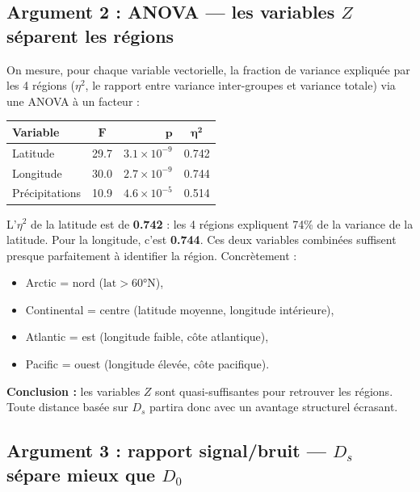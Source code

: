 \documentclass[11pt, a4paper]{article}
\theoremstyle{definition}
\theoremstyle{remark}
\begin{document}
\subsection{Argument 2 : ANOVA — les variables $Z$ séparent les régions}

On mesure, pour chaque variable vectorielle, la fraction de variance expliquée
par les 4 régions ($\eta^2$, le rapport entre variance inter-groupes et
variance totale) via une ANOVA à un facteur :

\begin{center}
\begin{tabular}{lcrc}
  \toprule
  \textbf{Variable} & $\boldsymbol{F}$ & $\boldsymbol{p}$ & $\boldsymbol{\eta^2}$ \\
  \midrule
  Latitude      & 29.7 & $3.1 \times 10^{-9}$ & 0.742 \\
  Longitude     & 30.0 & $2.7 \times 10^{-9}$ & 0.744 \\
  Précipitations & 10.9 & $4.6 \times 10^{-5}$ & 0.514 \\
  \bottomrule
\end{tabular}
\end{center}

L'$\eta^2$ de la latitude est de \textbf{0.742} : les 4 régions expliquent
74\% de la variance de la latitude. Pour la longitude, c'est \textbf{0.744}.
Ces deux variables combinées suffisent presque parfaitement à identifier la
région. Concrètement :
\begin{itemize}[nosep]
  \item Arctic = nord ($\text{lat} > 60°$N),
  \item Continental = centre (latitude moyenne, longitude intérieure),
  \item Atlantic = est (longitude faible, côte atlantique),
  \item Pacific = ouest (longitude élevée, côte pacifique).
\end{itemize}

\textbf{Conclusion :} les variables $Z$ sont quasi-suffisantes pour retrouver
les régions. Toute distance basée sur $D_s$ partira donc avec un avantage
structurel écrasant.

\subsection{Argument 3 : rapport signal/bruit — $D_s$ sépare mieux que $D_0$}
\end{document}
